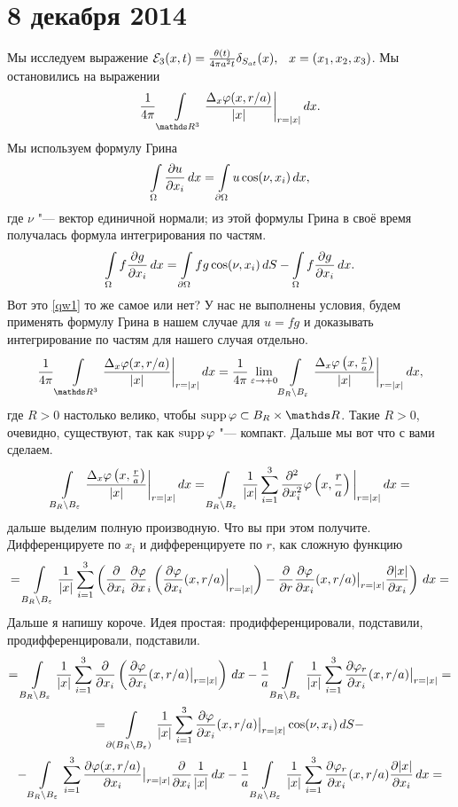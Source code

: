 \section{8 декабря 2014}
Мы исследуем выражение $\mathcal E_3(x,t) = \frac{\theta(t)}{4\pi a^2 t}\delta_{S_{at}}(x),\hskip .75em plus.1em minus.08em\relax x = (x_1,x_2,x_3)$. Мы остановились на выражении
\begin{equation}\label{qw1}
  \frac1{4\pi}\Gint{\R^3}   \frac{\Delta_x\phi(x,r/a)}{|x|}\bigg|_{r=|x|}\,dx.
\end{equation}
Мы используем формулу Грина
\[
  \int\limits_{\Omega}\frac{\partial u}{\partial x_i}\,dx = \int\limits_{\partial\Omega} u\cos(\nu,x_i)\,dx,
\]
где $\nu$ "--- вектор единичной нормали; из этой формулы Грина в своё время получалась формула интегрирования по частям.
\[
  \int\limits_{\Omega} f\frac{\partial g}{\partial x_i}\,dx = \int\limits_{\partial \Omega}fg\cos(\nu,x_i)\,dS - \int\limits_{\Omega} f\frac{\partial g}{\partial x_i}\,dx.
\]
Вот это \eqref{qw1} то же самое или нет? У нас не выполнены условия, будем применять формулу Грина в нашем случае для $u=fg$ и доказывать интегрирование по частям для нашего случая отдельно.
\[
  \frac1{4\pi}\Gint{\R^3}   \frac{\Delta_x\phi(x,r/a)}{|x|}\bigg|_{r=|x|}\,dx = 
  \frac1{4\pi}\yo\e{+0}\Gint{B_R\dd B_\e}\frac{\Delta_x\phi\left(x,\frac ra\right)}{|x|}\bigg|_{r=|x|}\,dx,
\]
где $R>0$ настолько велико, чтобы $\supp\phi\subset B_R\times\R$. Такие $R>0$, очевидно, существуют, так как $\operatorname{supp}\varphi$ "--- компакт.
Дальше мы вот что с вами сделаем.
\[
  \int\limits_{B_R\setminus B_\varepsilon}\frac{\Delta_x\varphi\left(x,\frac ra\right)}{|x|}\bigg|_{r=|x|}\,dx = 
  \int\limits_{B_R\setminus B_\varepsilon}\frac1{|x|}\sum\limits_{i = 1}^{3}\frac{\partial ^2}{\partial x_i^2}\varphi\left(x,\frac ra\right)\bigg|_{r=|x|}\,dx = 
\]
дальше выделим полную производную. Что вы при этом получите. Дифференцируете по $x_i$ и дифференцируете по $r$, как сложную функцию
\[
  = \int\limits_{B_R\setminus B_\varepsilon}\frac1{|x|}\sum\limits_{i = 1}^{3}\left(\frac{\partial }{\partial x_i}\,\frac{\partial \varphi}{\partial x}_i\left(\frac{\partial \varphi}{\partial x_i}(x,r/a)\Big|_{r=|x|}\right) -
  \frac{\partial }{\partial r}\frac{\partial \varphi}{\partial x_i}(x,r/a)\big|_{r=|x|}\frac{\partial |x|}{\partial x_i}\right)\,dx=
\]
Дальше я напишу короче. Идея простая: продифференцировали, подставили, продифференцировали, подставили.
\begin{multline*}
  =\int\limits_{B_R\setminus B_\varepsilon}\frac1{|x|}\sum\limits_{i = 1}^{3}\frac{\partial }{\partial x_i}\left(\frac{\partial \varphi}{\partial x_i}(x,r/a)\big|_{r=|x|}\right)\,dx - 
  \frac1a\int\limits_{B_R\setminus B_\varepsilon}\frac1{|x|}\sum\limits_{i = 1}^{3}\frac{\partial \varphi_r}{\partial x_i}(x,r/a)\big|_{r=|x|} = \\
  =
  \int\limits_{\partial(B_R\setminus B_\varepsilon)}\frac1{|x|}\sum\limits_{i = 1}^{3}\frac{\partial \varphi}{\partial x_i}(x,r/a)\big|_{r=|x|}\cos(\nu,x_i)\,dS -\\
  -\int\limits_{B_R\setminus B_\varepsilon}\sum\limits_{i = 1}^{3}\frac{\partial \varphi(x,r/a)}{\partial x_i}\big|_{r=|x|}\frac{\partial }{\partial x_i}\frac1{|x|}\,dx
  -\frac1a\int\limits_{B_R\setminus B_\varepsilon}\frac1{|x|}\sum\limits_{i = 1}^{3}\frac{\partial \varphi_r}{\partial x_i}(x,r/a)\frac{\partial |x|}{\partial x_i}\,dx=
\end{multline*}
